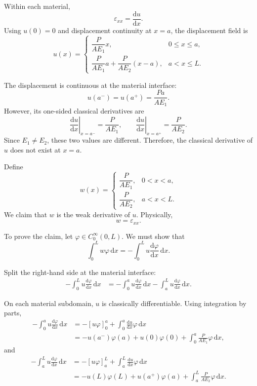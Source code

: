 \documentclass[11pt]{article}
\newcommand{\dd}{\mathrm{d}}
\begin{document}
Within each material,
\[
\varepsilon_{xx}=\frac{\dd u}{\dd x}.
\]
Using $u(0)=0$ and displacement continuity at $x=a$, the displacement
field is
\[
u(x)=
\begin{cases}
\dfrac{P}{AE_1}x,
&0\leq x\leq a,\\[4mm]
\dfrac{P}{AE_1}a
+\dfrac{P}{AE_2}(x-a),
&a<x\leq L.
\end{cases}
\]

The displacement is continuous at the material interface:
\[
u(a^-)=u(a^+)=\frac{Pa}{AE_1}.
\]
However, its one-sided classical derivatives are
\[
\left.\frac{\dd u}{\dd x}\right|_{x=a^-}
=
\frac{P}{AE_1},
\qquad
\left.\frac{\dd u}{\dd x}\right|_{x=a^+}
=
\frac{P}{AE_2}.
\]
Since $E_1\neq E_2$, these two values are different. Therefore, the
classical derivative of $u$ does not exist at $x=a$.

Define
\[
w(x)=
\begin{cases}
\dfrac{P}{AE_1}, & 0<x<a,\\[3mm]
\dfrac{P}{AE_2}, & a<x<L.
\end{cases}
\]
We claim that $w$ is the weak derivative of $u$. Physically,
\[
w=\varepsilon_{xx}.
\]

To prove the claim, let $\varphi\in C_0^\infty(0,L)$. We must show that
\[
\int_0^L w\varphi\,\dd x
=
-\int_0^L u\frac{\dd\varphi}{\dd x}\,\dd x.
\]

Split the right-hand side at the material interface:
\begin{align}
-\int_0^L u\frac{\dd\varphi}{\dd x}\,\dd x
&=
-\int_0^a u\frac{\dd\varphi}{\dd x}\,\dd x
-\int_a^L u\frac{\dd\varphi}{\dd x}\,\dd x.
\label{eq:bar-split}
\end{align}

On each material subdomain, $u$ is classically differentiable.
Using integration by parts,
\begin{align}
-\int_0^a u\frac{\dd\varphi}{\dd x}\,\dd x
&=
-\left[u\varphi\right]_0^a
+
\int_0^a \frac{\dd u}{\dd x}\varphi\,\dd x
\nonumber\\
&=
-u(a^-)\varphi(a)
+u(0)\varphi(0)
+
\int_0^a \frac{P}{AE_1}\varphi\,\dd x,
\label{eq:bar-left}
\end{align}
and
\begin{align}
-\int_a^L u\frac{\dd\varphi}{\dd x}\,\dd x
&=
-\left[u\varphi\right]_a^L
+
\int_a^L \frac{\dd u}{\dd x}\varphi\,\dd x
\nonumber\\
&=
-u(L)\varphi(L)
+u(a^+)\varphi(a)
+
\int_a^L \frac{P}{AE_2}\varphi\,\dd x.
\label{eq:bar-right}
\end{align}
\end{document}
